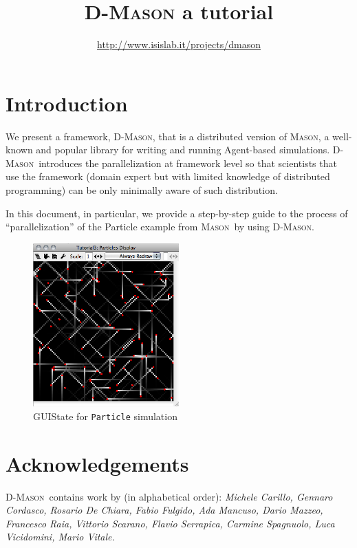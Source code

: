 \documentclass{article}
\def\ma{\textsc{Mason}}
\def\dm{\textsc{D-Mason}}
\begin{document}
\pagestyle{empty}
\sffamily
\title{\dm\: a tutorial}
\author{\url{http://www.isislab.it/projects/dmason}}
\maketitle



\section{Introduction}
We present a framework, \dm, that is a distributed version of  \ma, a well-known and popular library for writing and running Agent-based simulations. \dm\ introduces the parallelization at framework level so that scientists that use the framework (domain expert but with limited knowledge of distributed programming) can be only minimally aware of such distribution. 

In this document, in particular, we provide a step-by-step guide to the process of ``parallelization'' of the Particle example from \ma\ by using \dm.
\begin{figure}[ht]
	\centering
		\includegraphics[width=0.5\textwidth, bb=0 0 470 520]{particles.png}	
		\caption{GUIState for \texttt{Particle} simulation}
	\label{fig:p01}
\end{figure}

\section{Acknowledgements}
\dm\ contains work by (in alphabetical order): \textit{Michele Carillo, Gennaro Cordasco, Rosario De Chiara, Fabio Fulgido, Ada Mancuso, Dario Mazzeo, Francesco Raia, Vittorio Scarano, Flavio Serrapica, Carmine Spagnuolo, 
Luca Vicidomini, Mario Vitale.}
\end{document}
